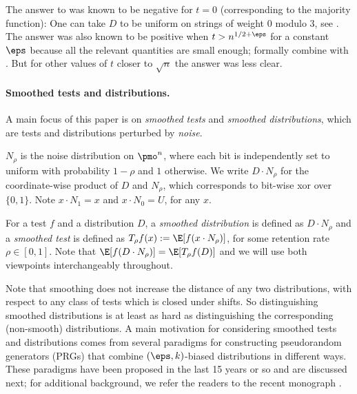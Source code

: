 The answer to  was known to be negative for $t=0$ (corresponding to the majority function): One can take $D$ to be uniform on strings of weight 0 modulo $3$, see \cite{Bazzi-pseudobinomial}.  The answer was also known to be positive when $t > n^{1/2+\eps}$ for a constant $\eps$ because all the relevant quantities are small enough; formally combine  with .  But for other values of $t$ closer to $\sqrt{n}$ the answer was less clear.

\paragraph{Smoothed tests and distributions.}
A main focus of this paper is on \emph{smoothed tests} and \emph{smoothed distributions}, which are tests and distributions perturbed by \emph{noise}.

\begin{definition}
$N_\rho$ is the noise distribution on $\pmo^n$, where each bit is independently set to uniform with probability $1-\rho$ and $1$ otherwise.  We write $D \cdot N_\rho$ for the coordinate-wise product of $D$ and $N_\rho$, which corresponds to bit-wise xor over $\{0,1\}$.
Note $x \cdot N_1 = x$ and $x \cdot N_0 = U$, for any $x$.

\end{definition}

For a test $f$ and a distribution $D$, a \emph{smoothed distribution} is defined as $D \cdot N_\rho$ and a \emph{smoothed test} is defined as $T_\rho f (x) := \E[f(x \cdot N_\rho)]$, for some retention rate $\rho \in [0,1]$.
Note that $\E[f(D\cdot N_\rho)] = \E[T_\rho f(D)]$ and we will use both viewpoints interchangeably throughout.

Note that smoothing does not increase the distance of any two distributions, with respect to any class of tests which is closed under shifts.  So distinguishing smoothed distributions is at least as hard as distinguishing the corresponding (non-smooth) distributions.
A main motivation for considering smoothed tests and distributions comes from several paradigms for constructing pseudorandom generators (PRGs) that combine $(\eps,k)$-biased distributions in different
ways.  These paradigms have been proposed in the last 15 years or so and are discussed next; for additional background, we refer the readers to the recent monograph \cite{DBLP:journals/eccc/HatamiH23}.

